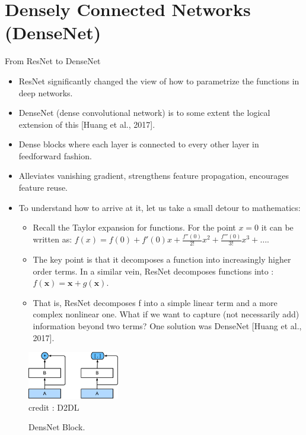 \section{Densely Connected Networks (DenseNet)}

\begin{vbframe}{From ResNet to DenseNet}
    \begin{itemize}
        \item ResNet significantly changed the view of how to parametrize the functions in deep networks. 
        \item DenseNet (dense convolutional network) is to some extent the logical extension of this [Huang et al., 2017]. 
        \item Dense blocks where each layer is connected to every other layer in feedforward fashion.
        \item Alleviates vanishing gradient, strengthens feature propagation, encourages feature reuse.
        \item To understand how to arrive at it, let us take a small detour to mathematics: 
        \begin{itemize}
             \item Recall the Taylor expansion for functions. For the point  $x=0$  it can be written as: $f(x) = f(0) + f'(0) x + \frac{f''(0)}{2!}  x^2 + \frac{f'''(0)}{3!}  x^3 + \ldots.$
             \item The key point is that it decomposes a function into increasingly higher order terms. In a similar vein, ResNet decomposes functions into : $f(\mathbf{x}) = \mathbf{x} + g(\mathbf{x}).$
             \item That is, ResNet decomposes  f  into a simple linear term and a more complex nonlinear one. What if we want to capture (not necessarily add) information beyond two terms? One solution was DenseNet [Huang et al., 2017].
        \end{itemize}
    \end{itemize}
    
     \begin{figure}
  \centering
    \includegraphics[width=4cm]{plots/moderncnn/densenet-block.png}
    \tiny{\\ credit : D2DL}
    \caption{ DensNet Block.}
  \end{figure}
  

\end{vbframe}
